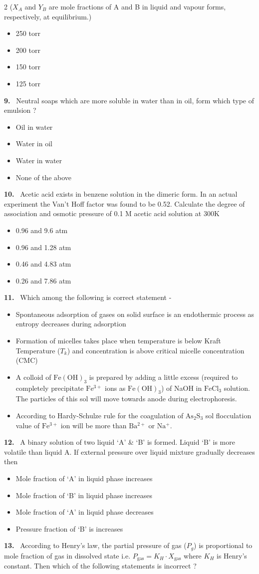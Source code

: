 \documentclass[10pt]{extarticle}
\newcommand{\qn}[1]{\par\smallskip\noindent\textbf{#1.}~}
\newenvironment{qoptions}{\begin{itemize}[leftmargin=1.8em,itemsep=1pt,topsep=2pt,label={}]}{\end{itemize}}
\newcommand{\opt}[2]{\item[(#1)] #2}
\begin{document}
\begin{multicols}{2}
($X_A$ and $Y_B$ are mole fractions of A and B in liquid and vapour forms, respectively, at equilibrium.)
\begin{qoptions}
\opt{A}{250 torr}
\opt{B}{200 torr}
\opt{C}{150 torr}
\opt{D}{125 torr}
\end{qoptions}
\qn{9} Neutral soaps which are more soluble in water than in oil, form which type of emulsion ?
\begin{qoptions}
\opt{A}{Oil in water}
\opt{B}{Water in oil}
\opt{C}{Water in water}
\opt{D}{None of the above}
\end{qoptions}
\qn{10} Acetic acid exists in benzene solution in the dimeric form. In an actual experiment the Van't Hoff factor was found to be 0.52. Calculate the degree of association and osmotic pressure of 0.1 M acetic acid solution at 300K
\begin{qoptions}
\opt{A}{0.96 and 9.6 atm}
\opt{B}{0.96 and 1.28 atm}
\opt{C}{0.46 and 4.83 atm}
\opt{D}{0.26 and 7.86 atm}
\end{qoptions}
\qn{11} Which among the following is correct statement -
\begin{qoptions}
\opt{A}{Spontaneous adsorption of gases on solid surface is an endothermic process as entropy decreases during adsorption}
\opt{B}{Formation of micelles takes place when temperature is below Kraft Temperature ($T_k$) and concentration is above critical micelle concentration (CMC)}
\opt{C}{A colloid of $\mathrm{Fe(OH)_3}$ is prepared by adding a little excess (required to completely precipitate $\mathrm{Fe^{3+}}$ ions as $\mathrm{Fe(OH)_3}$) of NaOH in $\mathrm{FeCl_3}$ solution. The particles of this sol will move towards anode during electrophoresis.}
\opt{D}{According to Hardy-Schulze rule for the coagulation of $\mathrm{As_2S_3}$ sol flocculation value of $\mathrm{Fe^{3+}}$ ion will be more than $\mathrm{Ba^{2+}}$ or $\mathrm{Na^+}$.}
\end{qoptions}
\qn{12} A binary solution of two liquid `A' \& `B' is formed. Liquid `B' is more volatile than liquid A. If external pressure over liquid mixture gradually decreases then
\begin{qoptions}
\opt{A}{Mole fraction of `A' in liquid phase increases}
\opt{B}{Mole fraction of `B' in liquid phase increases}
\opt{C}{Mole fraction of `A' in liquid phase decreases}
\opt{D}{Pressure fraction of `B' is increases}
\end{qoptions}
\qn{13} According to Henry's law, the partial pressure of gas ($P_g$) is proportional to mole fraction of gas in dissolved state i.e. $P_{\mathrm{gas}}=K_H\cdot X_{\mathrm{gas}}$ where $K_H$ is Henry's constant. Then which of the following statements is incorrect ?

\end{multicols}
\end{document}
